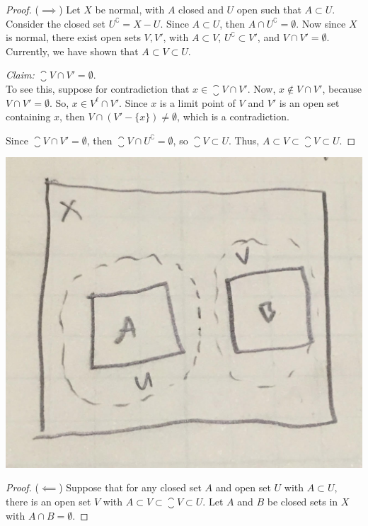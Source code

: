 \documentclass[letterpaper]{article}
\begin{document}
\begin{enumerate}
\begin{proof}($\implies$)
Let $X$ be normal, with $A$ closed and $U$ open such that $A\subset U$. Consider the closed set $U^\complement=X-U$. Since $A\subset U$, then $A\cap U^\complement = \emptyset$. Now since $X$ is normal, there exist open sets $V,V'$, with $A\subset V$, $U^\complement\subset V'$, and $V\cap V'=\emptyset$. Currently, we have shown that $A\subset V\subset U$. 

\textit{Claim:} $\closure{V}\cap V'=\emptyset$. \\
To see this, suppose for contradiction that $x\in\closure{V}\cap V'$. Now, $x\not\in V\cap V'$, because $V\cap V'=\emptyset$. So, $x\in V^\ell\cap V'$. Since $x$ is a limit point of $V$ and $V'$ is an open set containing $x$, then $V\cap(V'-\{x\})\neq\emptyset$, which is a contradiction. \qedwhite

Since $\closure{V}\cap V' = \emptyset$, then $\closure{V}\cap U^\complement = \emptyset$, so $\closure{V}\subset U$. Thus, 
$A\subset V\subset \closure{V}\subset U.$
\end{proof}
\pagebreak

\begin{center}
\includegraphics[scale=.1]{hw9_prob2_converse}
\end{center}

\begin{proof}($\impliedby$)
Suppose that for any closed set $A$ and open set $U$ with $A \subset U$, there is an open set $V$ with $A \subset V \subset \closure{V} \subset U$. Let $A$ and $B$ be closed sets in $X$ with $A\cap B=\emptyset$.


\end{proof}
\end{enumerate}
\end{document}
